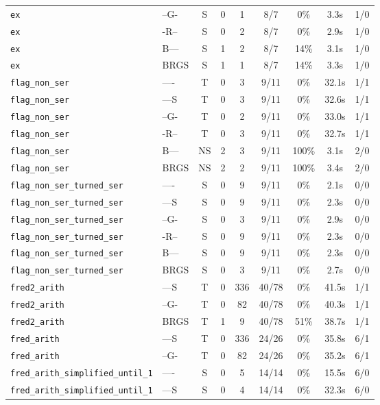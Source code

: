 \begin{tabular}{llccccccc}
\texttt{ex} & --G- & S & 0 & 1 & 8/7 & 0\% & 3.3s & 1/0 \\
\texttt{ex} & -R-- & S & 0 & 2 & 8/7 & 0\% & 2.9s & 1/0 \\
\texttt{ex} & B--- & S & 1 & 2 & 8/7 & 14\% & 3.1s & 1/0 \\
\texttt{ex} & BRGS & S & 1 & 1 & 8/7 & 14\% & 3.3s & 1/0 \\
\texttt{flag_non_ser} & ---- & T & 0 & 3 & 9/11 & 0\% & 32.1s & 1/1 \\
\texttt{flag_non_ser} & ---S & T & 0 & 3 & 9/11 & 0\% & 32.6s & 1/1 \\
\texttt{flag_non_ser} & --G- & T & 0 & 2 & 9/11 & 0\% & 33.0s & 1/1 \\
\texttt{flag_non_ser} & -R-- & T & 0 & 3 & 9/11 & 0\% & 32.7s & 1/1 \\
\texttt{flag_non_ser} & B--- & NS & 2 & 3 & 9/11 & 100\% & 3.1s & 2/0 \\
\texttt{flag_non_ser} & BRGS & NS & 2 & 2 & 9/11 & 100\% & 3.4s & 2/0 \\
\texttt{flag_non_ser_turned_ser} & ---- & S & 0 & 9 & 9/11 & 0\% & 2.1s & 0/0 \\
\texttt{flag_non_ser_turned_ser} & ---S & S & 0 & 9 & 9/11 & 0\% & 2.3s & 0/0 \\
\texttt{flag_non_ser_turned_ser} & --G- & S & 0 & 3 & 9/11 & 0\% & 2.9s & 0/0 \\
\texttt{flag_non_ser_turned_ser} & -R-- & S & 0 & 9 & 9/11 & 0\% & 2.3s & 0/0 \\
\texttt{flag_non_ser_turned_ser} & B--- & S & 0 & 9 & 9/11 & 0\% & 2.3s & 0/0 \\
\texttt{flag_non_ser_turned_ser} & BRGS & S & 0 & 3 & 9/11 & 0\% & 2.7s & 0/0 \\
\texttt{fred2_arith} & ---S & T & 0 & 336 & 40/78 & 0\% & 41.5s & 1/1 \\
\texttt{fred2_arith} & --G- & T & 0 & 82 & 40/78 & 0\% & 40.3s & 1/1 \\
\texttt{fred2_arith} & BRGS & T & 1 & 9 & 40/78 & 51\% & 38.7s & 1/1 \\
\texttt{fred_arith} & ---S & T & 0 & 336 & 24/26 & 0\% & 35.8s & 6/1 \\
\texttt{fred_arith} & --G- & T & 0 & 82 & 24/26 & 0\% & 35.2s & 6/1 \\
\texttt{fred_arith_simplified_until_1} & ---- & S & 0 & 5 & 14/14 & 0\% & 15.5s & 6/0 \\
\texttt{fred_arith_simplified_until_1} & ---S & S & 0 & 4 & 14/14 & 0\% & 32.3s & 6/0 \\

\end{tabular}
